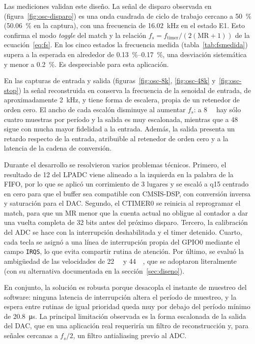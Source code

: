 \documentclass[11pt,a4paper]{article}
\begin{document}
Las mediciones validan este diseño. La señal de disparo observada en
 (figura~\ref{fig:osc-disparo}) es una onda cuadrada de ciclo de
trabajo cercano a \qty{50}{\percent} (\qty{50.06}{\percent} en la captura), con
una frecuencia de \qty{16.02}{\kilo\hertz} en el estado E1. Esto confirma el
modo \emph{toggle} del match y la relación $f_s = f_{\text{timer}}/(2(\text{MR}+1))$
de la ecuación~\eqref{eq:fs}. En los cinco estados la frecuencia medida
(tabla~\ref{tab:fsmedida}) supera a la esperada en alrededor de
\qtyrange{0.13}{0.17}{\percent}, una desviación sistemática y menor a
\qty{0.2}{\percent}. Es despreciable para esta aplicación.

En las capturas de entrada y salida
(figuras~\ref{fig:osc-8k}, \ref{fig:osc-48k} y~\ref{fig:osc-stop}) la señal
reconstruida en  conserva la frecuencia de la senoidal de entrada,
de aproximadamente \qty{2}{\kilo\hertz}, y tiene forma de escalera, propia de
un retenedor de orden cero. El ancho de cada escalón disminuye al aumentar
$f_s$: a \qty{8}{\kilo\sps} hay sólo cuatro muestras por período y la salida es
muy escalonada, mientras que a \qty{48}{\kilo\sps} sigue con mucha mayor
fidelidad a la entrada. Además, la salida presenta un retardo respecto de la
entrada, atribuible al retenedor de orden cero y a la latencia de la cadena de
conversión.

Durante el desarrollo se resolvieron varios problemas técnicos. Primero, el
resultado de \qty{12}{\bit} del LPADC viene alineado a la izquierda en la
palabra de la FIFO, por lo que se aplicó un corrimiento de 3 lugares y se
escaló a q15 centrado en cero para que el buffer sea compatible con CMSIS-DSP,
con conversión inversa y saturación para el DAC. Segundo, el CTIMER0 se reinicia
al reprogramar el match, para que un MR menor que la cuenta actual no obligue
al contador a dar una vuelta completa de 32 bits antes del próximo disparo.
Tercero, la calibración del ADC se hace con la interrupción deshabilitada y el
timer detenido. Cuarto, cada tecla se asignó a una línea de interrupción propia
del GPIO0 mediante el campo \texttt{IRQS}, lo que evita compartir rutina de
atención. Por último, se evaluó la ambigüedad de las velocidades de \qty{22}{\kilo\sps}
y \qty{44}{\kilo\sps}, que se adoptaron literalmente (con su alternativa documentada en
la sección~\ref{sec:diseno}).

En conjunto, la solución es robusta porque desacopla el instante de muestreo
del software: ninguna latencia de interrupción altera el período de muestreo,
y la espera entre rutinas de igual prioridad queda muy por debajo del período
mínimo de \qty{20.8}{\micro\second}. La principal limitación observada es la
forma escalonada de la salida del DAC, que en una aplicación real requeriría un
filtro de reconstrucción y, para señales cercanas a $f_s/2$, un filtro
antialiasing previo al ADC.
\end{document}
